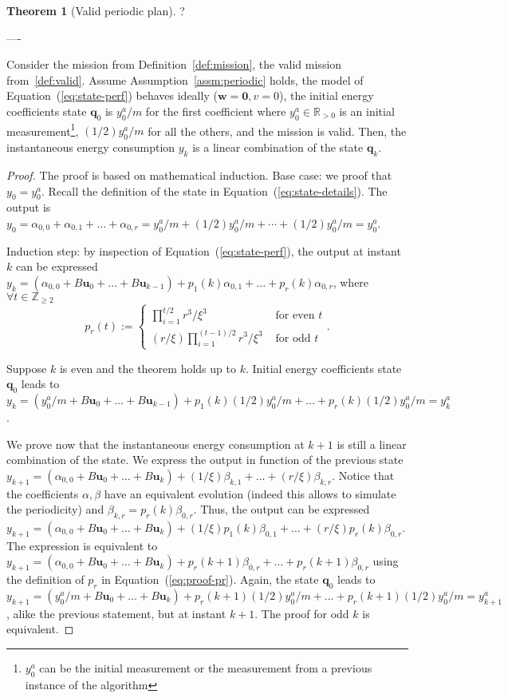 \documentclass[letterpaper,10pt,conference]{ieeeconf}
\theoremstyle{definition}
\newtheorem{thm}{Theorem}[section]
\begin{document}
\begin{thm}[Valid periodic plan]\label{thm:state-vs-energy}  
?

  ----

  Consider the mission from Definition~\ref{def:mission}, the valid mission from~\ref{def:valid}. Assume Assumption~\ref{assm:periodic} holds, the model of Equation~(\ref{eq:state-perf}) behaves ideally ($\mathbf{w}=\mathbf{0},v=0$), the initial energy coefficients state $\mathbf{q}_0$ is $y_0^a/m$ for the first coefficient where $y_0^a\in\mathbb{R}_{>0}$ is an initial measurement\footnote{$y_0^a$ can be the initial measurement or the measurement from a previous instance of the algorithm}, $(1/2)y_0^a/m$ for all the others, and the mission is valid.
  Then, the instantaneous energy consumption $y_k$ is a linear combination of the state $\mathbf{q}_k$.
\end{thm}
\begin{proof}
  The proof is based on mathematical induction. 
  Base case: we proof that $y_0=y_0^a$. Recall the definition of the state in Equation~(\ref{eq:state-details}). The output is $y_{0}=\alpha_{0,0}+\alpha_{0,1}+\dots+\alpha_{0,r}=y_0^a/m+(1/2)y_0^a/m+\cdots+(1/2)y_0^a/m=y_0^a$.
  
  Induction step: by inspection of Equation~(\ref{eq:state-perf}), the output at instant $k$ can be expressed $y_{k}=(\alpha_{0,0}+B\mathbf{u}_0+\dots+B\mathbf{u}_{k-1})+p_1(k)\alpha_{0,1}+\dots+p_r(k)\alpha_{0,r}$, where $\forall t\in\mathbb{Z}_{\geq 2}$
  \begin{equation}\label{eq:proof-pr}
    p_r(t):=\begin{cases}
      \prod_{i=1}^{t/2}{r^3/\xi^3}&\text{ for even }t\\
      (r/\xi)\prod_{i=1}^{(t-1)/2}{r^3/\xi^3}&\text{ for odd }t
    \end{cases}.
  \end{equation}
  
  Suppose $k$ is even and the theorem holds up to $k$. Initial energy coefficients state $\mathbf{q}_0$ leads to $y_{k}=(y_0^a/m+B\mathbf{u}_0+\dots+B\mathbf{u}_{k-1})+p_1(k)(1/2)y_0^a/m+\dots+p_r(k)(1/2)y_0^a/m=y_{k}^a$. 
  
  We prove now that the instantaneous energy consumption at $k+1$ is still a linear combination of the state. We express the output in function of the previous state $y_{k+1}=(\alpha_{0,0}+B\mathbf{u}_0+\dots+B\mathbf{u}_{k})+(1/\xi)\beta_{k,1}+\dots+(r/\xi)\beta_{k,r}$. Notice that the coefficients $\alpha,\beta$ have an equivalent evolution (indeed this allows to simulate the periodicity) and $\beta_{k,r}=p_r(k)\beta_{0,r}$. Thus, the output can be expressed $y_{k+1}=(\alpha_{0,0}+B\mathbf{u}_0+\dots+B\mathbf{u}_{k})+(1/\xi)p_1(k)\beta_{0,1}+\dots+(r/\xi)p_r(k)\beta_{0,r}$. The expression is equivalent to $y_{k+1}=(\alpha_{0,0}+B\mathbf{u}_0+\dots+B\mathbf{u}_{k})+p_r(k+1)\beta_{0,r}+\dots+p_r(k+1)\beta_{0,r}$ using the definition of $p_r$ in Equation~(\ref{eq:proof-pr}). Again, the state $\mathbf{q}_0$ leads to $y_{k+1}=(y_0^a/m+B\mathbf{u}_0+\dots+B\mathbf{u}_{k})+p_r(k+1)(1/2)y_0^a/m+\dots+p_r(k+1)(1/2)y_0^a/m=y_{k+1}^a$, alike the previous statement, but at instant $k+1$. The proof for odd $k$ is equivalent.
\end{proof}
\end{document}
